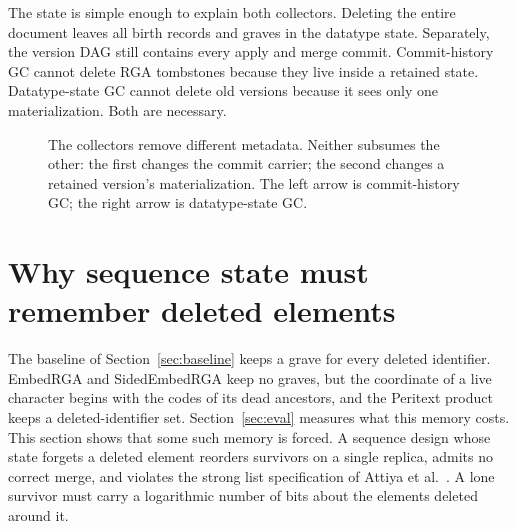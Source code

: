 The state is simple enough to explain both collectors. Deleting the entire
document leaves all birth records and graves in the datatype state. Separately,
the version DAG still contains every apply and merge commit. Commit-history GC
cannot delete RGA tombstones because they live inside a retained state.
Datatype-state GC cannot delete old versions because it sees only one
materialization. Both are necessary.

\begin{figure}[H]
\centering
{}
\caption{The collectors remove different metadata. Neither subsumes the
other: the first changes the commit carrier; the second changes a retained
version's materialization. The left arrow is commit-history GC; the right
arrow is datatype-state GC.}
\label{fig:two-kinds-gc}
\end{figure}

\section{Why sequence state must remember deleted elements}
\label{sec:retention}

The baseline of Section~\ref{sec:baseline} keeps a grave for every deleted
identifier. EmbedRGA and SidedEmbedRGA keep no graves, but the coordinate of a
live character begins with the codes of its dead ancestors, and the Peritext
product keeps a deleted-identifier set. Section~\ref{sec:eval} measures what
this memory costs. This section shows that some such memory is forced. A
sequence design whose state forgets a deleted element reorders survivors on a
single replica, admits no correct merge, and violates the strong list
specification of Attiya et al.~\cite{attiya2016list}. A lone survivor must
carry a logarithmic number of bits about the elements deleted around it.

